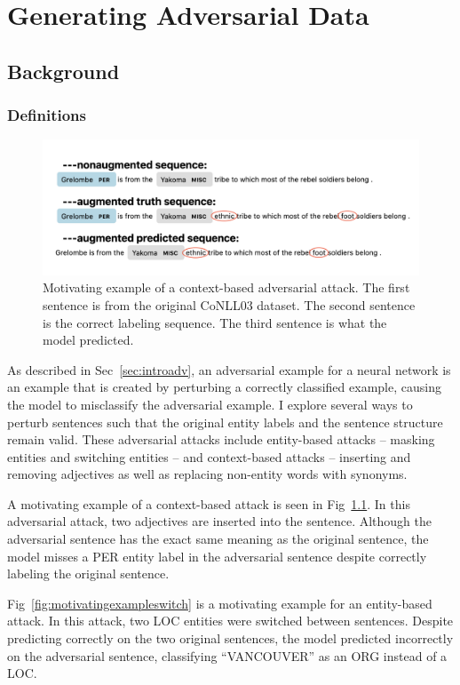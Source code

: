 \chapter{Generating Adversarial Data}
\section{Background}
\subsection{Definitions}
\begin{figure}[h]
	\centering
	\includegraphics[width=0.95\linewidth]{LatexDiss/figures/insertmotivatingexample.png}
	\caption{Motivating example of a context-based adversarial attack. The first sentence is from the original CoNLL03 dataset. The second sentence is the correct labeling sequence. The third sentence is what the model predicted.}
	\label{fig:motivatingexampleinsert}
\end{figure}


As described in Sec~\ref{sec:introadv}, an adversarial example for a neural network is an example that is created by perturbing a correctly classified example, causing the model to misclassify the adversarial example. I explore several ways to perturb sentences such that the original entity labels and the sentence structure remain valid. These adversarial attacks include entity-based attacks -- masking entities and switching entities -- and context-based attacks -- inserting and removing adjectives as well as replacing non-entity words with synonyms. 

A motivating example of a context-based attack is seen in Fig~\ref{fig:motivatingexampleinsert}. In this adversarial attack, two adjectives are inserted into the sentence. Although the adversarial sentence has the exact same meaning as the original sentence, the model misses a \textsc{PER} entity label in the adversarial sentence despite correctly labeling the original sentence.

Fig~\ref{fig:motivatingexampleswitch} is a motivating example for an entity-based attack. In this attack, two \textsc{LOC} entities were switched between sentences. Despite predicting correctly on the two original sentences, the model predicted incorrectly on the adversarial sentence, classifying ``VANCOUVER'' as an \textsc{ORG} instead of a \textsc{LOC}.

